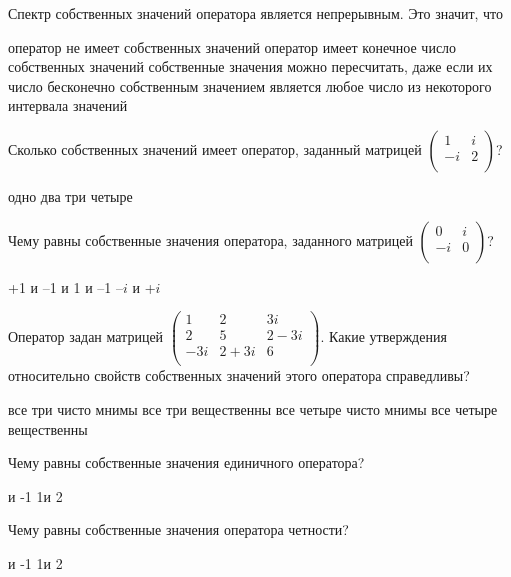 \documentclass[11pt,a4paper]{exam}
\begin{document}
\begin{questions}
\question Спектр собственных значений оператора является непрерывным. Это значит, что
\begin{choices}
\choice оператор не имеет собственных значений
\choice оператор имеет конечное число собственных значений
\choice собственные значения можно пересчитать, даже если их число бесконечно
\choice собственным значением является любое число из некоторого интервала значений
\end{choices}

\question Сколько собственных значений имеет оператор, заданный матрицей $\left( \begin{matrix}
   1 & i  \\
   -i & 2  \\
\end{matrix} \right)$?
\begin{choices}
\choice одно   
\choice два    
\choice три    
\choice четыре
\end{choices}

\question Чему равны собственные значения оператора, заданного матрицей $\left( \begin{matrix}
   0 & i  \\
   -i & 0  \\
\end{matrix} \right)$?
\begin{choices}
\choice +1 и –1      
 и 1     
 и –1       
\choice –$i$ и +$i$
\end{choices}

\question Оператор задан матрицей
$\left( \begin{matrix}
   1 & 2 & 3i  \\
   2 & 5 & 2-3i  \\
   -3i & 2+3i & 6  \\
\end{matrix} \right)$.
Какие утверждения относительно свойств собственных значений этого оператора справедливы?
\begin{choices}
\choice все три чисто мнимы      
\choice все три вещественны
\choice все четыре чисто мнимы      
\choice все четыре вещественны
\end{choices}

\question Чему равны собственные значения единичного оператора?
\begin{choices}
 и -1 
\choice 1и 2      
\end{choices}

\question Чему равны собственные значения оператора четности?
\begin{choices}
 и -1 
\choice 1и 2      
\end{choices}


\end{questions}
\end{document}
